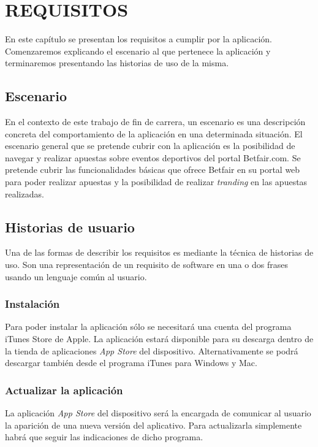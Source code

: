 \chapter{REQUISITOS}
\label{ch:requisitos}
En este capítulo se presentan los requisitos a cumplir por la aplicación. Comenzaremos explicando el escenario al que pertenece la aplicación y terminaremos presentando las historias de uso de la misma.
\section{Escenario}

En el contexto de este trabajo de fin de carrera, un escenario es una descripción concreta del comportamiento de la aplicación en una determinada situación. El escenario general que se pretende cubrir con la aplicación es la posibilidad de navegar y realizar apuestas sobre eventos deportivos del portal Betfair.com. Se pretende cubrir las funcionalidades básicas que ofrece Betfair en su portal web para poder realizar apuestas y la posibilidad de realizar \emph{tranding} en las apuestas realizadas.

\section{Historias de usuario}
 Una de las formas de describir los requisitos es mediante la técnica de historias de uso. Son una representación de un requisito de software en una o dos frases usando un lenguaje común al usuario.
 
\subsection{Instalación} Para poder instalar la aplicación sólo se necesitará una cuenta del programa iTunes Store de Apple. La aplicación estará disponible para su descarga dentro de la tienda de aplicaciones  \emph{App Store} del dispositivo.  Alternativamente se podrá descargar también desde el programa iTunes para Windows y Mac. 
\subsection{Actualizar la aplicación}
La aplicación  \emph{App Store}  del dispositivo será la encargada de comunicar al usuario la aparición de una nueva versión del aplicativo. Para actualizarla simplemente habrá que seguir las indicaciones de dicho programa. %

